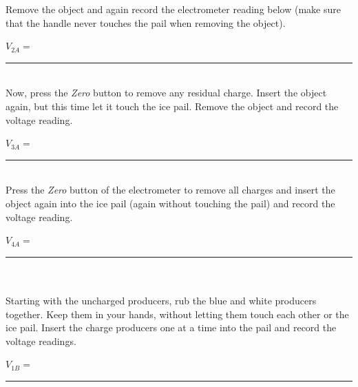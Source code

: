 {{{%

\noindent Remove the object and again record the electrometer
reading below (make sure that the handle never touches the pail
when removing the object).\\

\vspace{1cm}

\hspace{4cm}$V_{2A}=$\rule{5.0cm}{.1mm}\\


\noindent Now, press the {\it Zero} button to remove any residual
charge.  Insert the object again, but this time let it touch the
ice pail.  Remove the object and record the voltage
reading.\\

\vspace{1cm}

\hspace{4cm}$V_{3A}=$\rule{5.0cm}{.1mm}\\


\noindent Press the {\it Zero} button of the electrometer to
remove all charges and insert the object again into the ice pail
(again without touching the pail) and record
the voltage reading.\\

\vspace{1cm}

\hspace{4cm}$V_{4A}=$\rule{5.0cm}{.1mm}\\



\\
\noindent Starting with the uncharged producers, rub the blue and
white producers together.  Keep them in your hands, without
letting them touch each other or the ice pail. Insert the charge
producers one at a time into the pail and record the voltage readings.\\


\vspace{0.5cm}

\hspace{4cm}$V_{1B}=$\rule{5.0cm}{.1mm}

}}}
